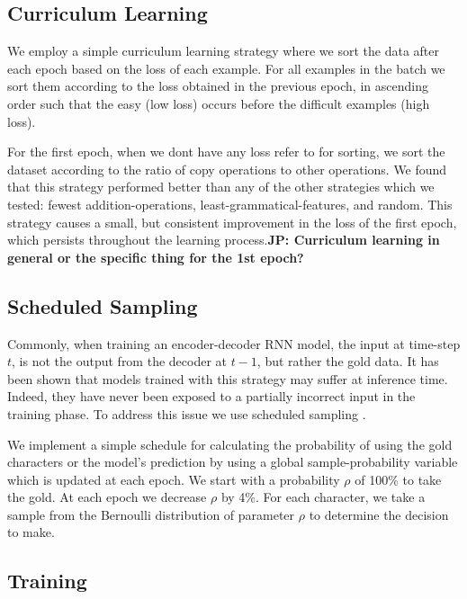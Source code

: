 \documentclass[11pt,a4paper]{article}
\newcommand\jp[1]{\textbf{JP: #1}}
\begin{document}
\subsection{Curriculum Learning}

We employ a simple curriculum learning strategy where we 
sort the data after each epoch based on the loss of each example. For
all examples in the batch we sort them according to the loss obtained
in the previous epoch, in ascending order such that the easy (low
loss) occurs before the difficult examples (high loss).

For the first epoch, when we dont have any loss refer to for sorting,
we sort the dataset according to the ratio of copy operations to other
operations. We found that this strategy performed better than any of
the other strategies which we tested: fewest addition-operations,
least-grammatical-features, and random.  This strategy causes a small,
but consistent improvement in the loss of the first epoch, which
persists throughout the learning process.\jp{Curriculum learning in
general or the specific thing for the 1st epoch?}

\subsection{Scheduled Sampling}

Commonly, when training an encoder-decoder RNN model, the input at
time-step $t$, is not the output from the decoder at $t-1$, but rather
the gold data.  It has been shown that models trained with this
strategy may suffer at inference time. Indeed, they have never been
exposed to a partially incorrect input in the training phase.  To
address this issue we use scheduled sampling
\cite{DBLP:conf/nips/BengioVJS15}.

We implement a simple schedule for calculating the probability of
using the gold characters or the model's prediction by using a global
sample-probability variable which is updated at each epoch. We start
with a probability \(\rho\) of 100\% to take the gold. At each epoch
we decrease \(\rho\) by 4\%. For each character, we take a sample from
the Bernoulli distribution of parameter \(\rho\) to determine the
decision to make.

\subsection{Training}
\end{document}
